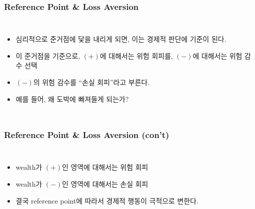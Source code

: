 \documentclass[final]{beamer}
\begin{document}
\begin{frame}\frametitle{Reference Point \& Loss Aversion}\vspace{1.5em}
%
\begin{columns}[c]
\column{18em}
\begin{itemize}
\item 심리적으로 준거점에 닻을 내리게 되면, 이는 경제적 판단에 기준이 된다. 
\item 이 준거점을 기준으로, 
$(+)$에 대해서는 위험 회피를, $(-)$에 대해서는 위험 감수 선택 
\item $(-)$의 위험 감수를 ``손실 회피''라고 부른다.  
\item 예를 들어, 왜 도박에 빠져들게 되는가? 
\end{itemize}
%
\column{12em}
\end{columns}
\end{frame}
%
\begin{frame}\frametitle{Reference Point \& Loss Aversion (con't)}\vspace{3em}
%
\begin{columns}[c]
\column{15em}
\begin{itemize}
\item wealth가 $(+)$인 영역에 대해서는 위험 회피 
\item wealth가 $(-)$인 영역에 대해서는 손실 회피 
\item 결국 reference point에 따라서 경제적 행동이 극적으로 변한다. 
\end{itemize}
%
\column{14em}
\hspace{-1em}
\end{columns}
\end{frame}
%
\end{document}
